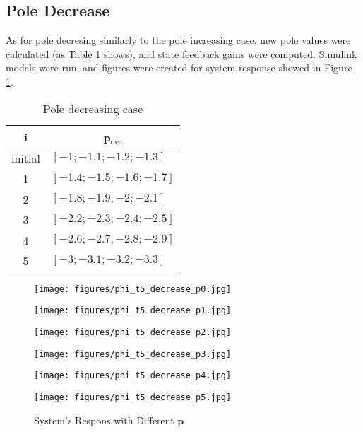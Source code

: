 \documentclass[12pt]{article}
\begin{document}
\newpage

\subsection*{Pole Decrease}
\noindent As for pole decresing similarly to the pole increasing case, new pole values were calculated (as Table \ref{tab:pdec} shows), and state feedback gains were computed. Simulink models were run, and figures were created for system response showed in Figure \ref{fig:pdec}.

\begin{table}[htbp]
  \centering
  \caption{Pole decreasing case}
  \label{tab:pdec}
  \begin{tabular}{cl}
    \hline
    i &\multicolumn{1}{c}{\textbf{p}$_{\text{dec}}$}\\[0.1cm]
    \hline
    initial & $[-1; -1.1; -1.2; -1.3]$ \\[0.1cm]
    1 & $[-1.4; -1.5; -1.6; -1.7]$\\[0.1cm]
    2 & $[-1.8; -1.9; -2; -2.1]$\\[0.1cm]
    3 & $[-2.2; -2.3; -2.4; -2.5]$\\[0.1cm]
    4 & $[-2.6; -2.7; -2.8; -2.9]$\\[0.1cm]
    5 & $[-3; -3.1; -3.2; -3.3]$
  \end{tabular}
\end{table}

\begin{figure}[htbp]
  \centering
  
  \begin{minipage}[b]{0.3\textwidth}
    \centering
    \texttt{[image: figures/phi\_t5\_decrease\_p0.jpg]}
  \end{minipage}%
  \hfill
  \begin{minipage}[b]{0.3\textwidth}
    \centering
    \texttt{[image: figures/phi\_t5\_decrease\_p1.jpg]}
  \end{minipage}%
  \hfill
  \begin{minipage}[b]{0.3\textwidth}
    \centering
    \texttt{[image: figures/phi\_t5\_decrease\_p2.jpg]}
  \end{minipage}%

  \medskip

  \begin{minipage}[b]{0.3\textwidth}
    \centering
    \texttt{[image: figures/phi\_t5\_decrease\_p3.jpg]}
  \end{minipage}%
  \hfill
  \begin{minipage}[b]{0.3\textwidth}
    \centering
    \texttt{[image: figures/phi\_t5\_decrease\_p4.jpg]}
  \end{minipage}%
  \hfill
  \begin{minipage}[b]{0.3\textwidth}
    \centering
    \texttt{[image: figures/phi\_t5\_decrease\_p5.jpg]}
  \end{minipage}%
  \label{fig:pdec}
  \caption{System's Respons with Different $\mathbf{p}$}
\end{figure}
\newpage
\end{document}
